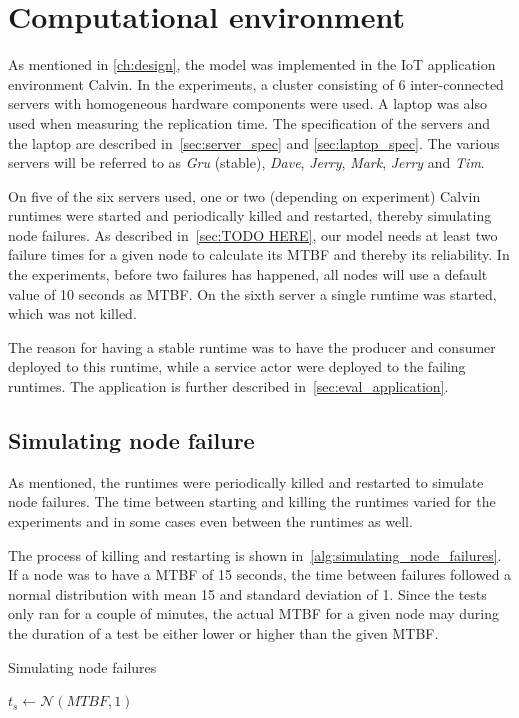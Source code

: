 \documentclass{cslthse-msc}
\begin{document}
\section{Computational environment} \label{sec:eval_comp_env}
As mentioned in \cref{ch:design}, the model was implemented in the IoT application environment Calvin. In the experiments, a cluster consisting of 6 inter-connected servers with homogeneous hardware components were used. A laptop was also used when measuring the replication time. The specification of the servers and the laptop are described in~\cref{sec:server_spec} and \cref{sec:laptop_spec}. The various servers will be referred to as \emph{Gru} (stable), \emph{Dave}, \emph{Jerry}, \emph{Mark}, \emph{Jerry} and \emph{Tim}.

On five of the six servers used, one or two (depending on experiment) Calvin runtimes were started and periodically killed and restarted, thereby simulating node failures. As described in~\cref{sec:TODO HERE}, our model needs at least two failure times for a given node to calculate its MTBF and thereby its reliability. In the experiments, before two failures has happened, all nodes will use a default value of 10 seconds as MTBF. On the sixth server a single runtime was started, which was not killed.

The reason for having a stable runtime was to have the producer and consumer deployed to this runtime, while a service actor were deployed to the failing runtimes. The application is further described in~\cref{sec:eval_application}.

\subsection{Simulating node failure} \label{sec:simulating_node_failure}
As mentioned, the runtimes were periodically killed and restarted to simulate node failures. The time between starting and killing the runtimes varied for the experiments and in some cases even between the runtimes as well.

The process of killing and restarting is shown in~\cref{alg:simulating_node_failures}. If a node was to have a MTBF of 15 seconds, the time between failures followed a normal distribution with mean 15 and standard deviation of 1. Since the tests only ran for a couple of minutes, the actual MTBF for a given node may during the duration of a test be either lower or higher than the given MTBF.

\begin{algorithm} 
	\caption{Simulating node failures} \label{alg:simulating_node_failures}
	\begin{algorithmic}[1]
		\State
		\State $t_{s}\gets \mathcal{N} (MTBF,1)$
		\State
		\State
	\EndWhile
	\end{algorithmic}
\end{algorithm}
\end{document}
